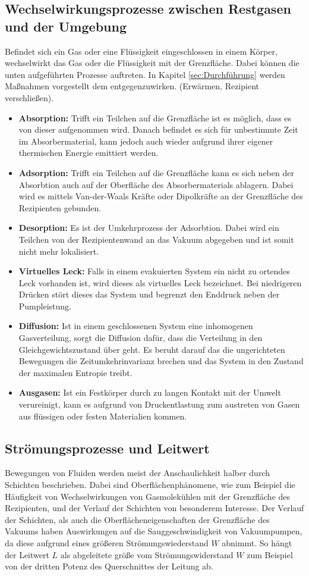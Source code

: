 \subsection{Wechselwirkungsprozesse zwischen Restgasen und der Umgebung}
Befindet sich ein Gas oder eine Flüssigkeit eingeschlossen in einem Körper, wechselwirkt das Gas oder die Flüssigkeit mit der Grenzfläche. Dabei können die unten aufgeführten Prozesse auftreten. In Kapitel \ref{sec:Durchführung} werden Maßnahmen vorgestellt dem entgegenzuwirken. (Erwärmen, Rezipient verschließen).
\begin{itemize}
  \item \textbf{Absorption:} Trifft ein Teilchen auf die Grenzfläche ist es möglich, dass es von dieser aufgenommen wird. Danach befindet es sich für unbestimmte Zeit im Absorbermaterial, kann jedoch auch wieder aufgrund ihrer eigener thermischen Energie emittiert werden.
  \item \textbf{Adsorption:} Trifft ein Teilchen auf die Grenzfläche kann es sich neben der Absorbtion auch auf der Oberfläche des Absorbermaterials ablagern. Dabei wird es mittels Van-der-Waals Kräfte oder Dipolkräfte an der Grenzfläche des Rezipienten gebunden.
  \item \textbf{Desorption:} Es ist der Umkehrprozess der Adsorbtion. Dabei wird ein Teilchen von der Rezipientenwand an das Vakuum abgegeben und ist somit nicht mehr lokalisiert.
  \item \textbf{Virtuelles Leck:} Falls in einem evakuierten System ein nicht zu ortendes Leck vorhanden ist, wird dieses als virtuelles Leck bezeichnet. Bei niedrigeren Drücken stört dieses das System und begrenzt den Enddruck neben der Pumpleistung.
  \item \textbf{Diffusion:} Ist in einem geschlossenen System eine inhomogenen Gasverteilung, sorgt die Diffusion dafür, dass die Verteilung in den Gleichgewichtszustand über geht. Es beruht darauf das die ungerichteten Bewegungen die Zeitumkehrinvarianz brechen und das System in den Zustand der maximalen Entropie treibt.
  \item \textbf{Ausgasen:} Ist ein Festkörper durch zu langen Kontakt mit der Umwelt verureinigt, kann es aufgrund von Druckentlastung zum austreten von Gasen aus flüssigen oder festen Materialien kommen.
\end{itemize}
\subsection{Strömungsprozesse und Leitwert}
Bewegungen von Fluiden werden meist der Anschaulichkeit halber durch Schichten beschrieben. Dabei sind Oberflächenphänomene, wie zum Beispiel die Häufigkeit von Wechselwirkungen von Gasmolekühlen mit der Grenzfläche des Rezipienten, und der Verlauf der Schichten von besonderem Interesse. Der Verlauf der Schichten, als auch die Oberflächeneigenschaften der Grenzfläche des Vakuums haben Auswirkungen auf die Sauggeschwindigkeit von Vakuumpumpen, da diese aufgrund eines größeren Strömungswiederstand $W$ abnimmt. So hängt der Leitwert $L$ als abgeleitete größe vom Strömungswiderstand $W$ zum Beispiel von der dritten Potenz des Querschnittes der Leitung ab. \cite{Jena}

